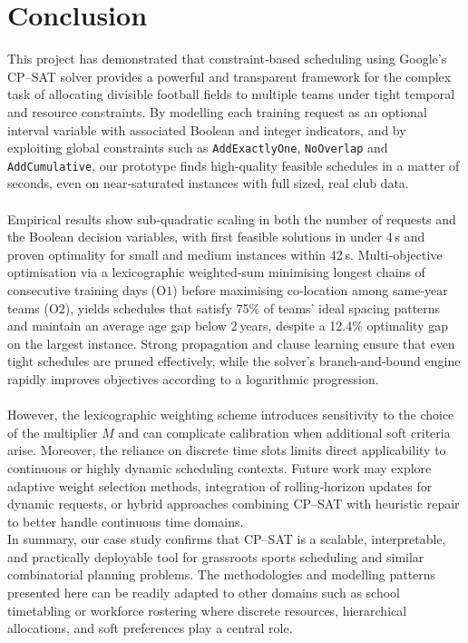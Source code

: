 \documentclass[12pt]{article}
\begin{document}
\section{Conclusion}

This project has demonstrated that constraint‐based scheduling using Google’s CP–SAT solver provides a powerful and transparent framework for the complex task of allocating divisible football fields to multiple teams under tight temporal and resource constraints. By modelling each training request as an optional interval variable with associated Boolean and integer indicators, and by exploiting global constraints such as \texttt{AddExactlyOne}, \texttt{NoOverlap} and \texttt{AddCumulative}, our prototype finds high‐quality feasible schedules in a matter of seconds, even on near‐saturated instances with full sized, real club data.
\\
\\
Empirical results show sub‐quadratic scaling in both the number of requests and the Boolean decision variables, with first feasible solutions in under 4 s and proven optimality for small and medium instances within 42 s. Multi‐objective optimisation via a lexicographic weighted‐sum minimising longest chains of consecutive training days (\(\mathrm{O1}\)) before maximising co‐location among same‐year teams (\(\mathrm{O2}\)), yields schedules that satisfy 75\% of teams’ ideal spacing patterns and maintain an average age gap below 2 years, despite a 12.4\% optimality gap on the largest instance. Strong propagation and clause learning ensure that even tight schedules are pruned effectively, while the solver’s branch‐and‐bound engine rapidly improves objectives according to a logarithmic progression.
\\
\\
However, the lexicographic weighting scheme introduces sensitivity to the choice of the multiplier \(M\) and can complicate calibration when additional soft criteria arise. Moreover, the reliance on discrete time slots limits direct applicability to continuous or highly dynamic scheduling contexts. Future work may explore adaptive weight selection methods, integration of rolling‐horizon updates for dynamic requests, or hybrid approaches combining CP–SAT with heuristic repair to better handle continuous time domains.
\\
In summary, our case study confirms that CP–SAT is a scalable, interpretable, and practically deployable tool for grassroots sports scheduling and similar combinatorial planning problems. The methodologies and modelling patterns presented here can be readily adapted to other domains such as school timetabling or workforce rostering where discrete resources, hierarchical allocations, and soft preferences play a central role.
\end{document}
